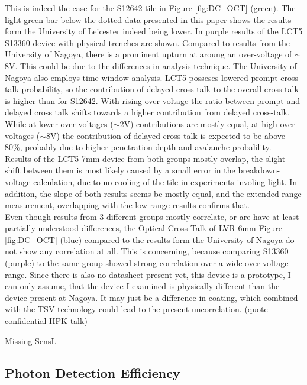 \documentclass[12pt,article,type=msc,colorback,accentcolor=tud9c]{tudthesis}
\begin{document}
This is indeed the case for the S12642 tile in Figure \ref{fig:DC_OCT} (green). The light green bar below the dotted data presented in this paper shows the results form the University of Leicester indeed being lower. In purple results of the LCT5 S13360 device with physical trenches are shown. Compared to results from the University of Nagoya, there is a prominent upturn at aroung an over-voltage of $\sim$8V. This could be due to the differences in analysis technique. The University of Nagoya also employs time window analysis. LCT5 posseses lowered prompt cross-talk probability, so the contribution of delayed cross-talk to the overall cross-talk is higher than for S12642. With rising over-voltage the ratio between prompt and delayed cross talk shifts towards a higher contribution from delayed cross-talk. While at lower over-voltages ($\sim$2V) contributions are mostly equal, at high over-voltages ($\sim$8V) the contribution of delayed cross-talk is expected to be above 80\%, probably due to higher penetration depth and avalanche probalility.\\
Results of the LCT5 7mm device from both groups mostly overlap, the slight shift between them is most likely caused by a small error in the breakdown-voltage calculation, due to no cooling of the tile in experiments involing light. In addition, the slope of both results seems be mostly equal, and the extended range measurement, overlapping with the low-range results confirms that.\\
Even though results from 3 different groups mostly correlate, or are have at least partially understood differences, the Optical Cross Talk of LVR 6mm Figure \ref{fig:DC_OCT} (blue) compared to the results form the University of Nagoya do not show any correlation at all. This is concerning, because comparing S13360 (purple) to the same group showed strong correlation over a wide over-voltage range. Since there is also no datasheet present yet, this device is a prototype, I can only assume, that the device I examined is physically different than the device present at Nagoya. It may just be a difference in coating, which combined with the TSV technology could lead to the present uncorrelation. (quote confidential HPK talk)

Missing SensL

\subsection{Photon Detection Efficiency}
\end{document}
